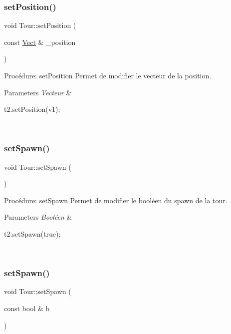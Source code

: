 \subsubsection{\texorpdfstring{set\+Position()}{setPosition()}}
{\footnotesize\ttfamily void Tour\+::set\+Position (\begin{DoxyParamCaption}\item[{const \hyperlink{classVect}{Vect} \&}]{\+\_\+position }\end{DoxyParamCaption})}



Procédure\+: set\+Position Permet de modifier le vecteur de la position. 


\begin{DoxyParams}{Parameters}
{\em Vecteur} & 
\begin{DoxyCode}
t2.setPosition(v1);
\end{DoxyCode}
 \\
\hline
\end{DoxyParams}
\mbox{\label{classTour_ae14b537e1e6fcfef00eadfd0d6d29e46}} 
\subsubsection{\texorpdfstring{set\+Spawn()}{setSpawn()}\hspace{0.1cm}{\footnotesize\ttfamily [1/2]}}
{\footnotesize\ttfamily void Tour\+::set\+Spawn (\begin{DoxyParamCaption}{ }\end{DoxyParamCaption})}



Procédure\+: set\+Spawn Permet de modifier le booléen du spawn de la tour. 


\begin{DoxyParams}{Parameters}
{\em Booléen} & 
\begin{DoxyCode}
t2.setSpawn(\textcolor{keyword}{true});
\end{DoxyCode}
 \\
\hline
\end{DoxyParams}
\mbox{\label{classTour_a896b0ab5f8a022d7deb6d599de8d4642}} 
\subsubsection{\texorpdfstring{set\+Spawn()}{setSpawn()}\hspace{0.1cm}{\footnotesize\ttfamily [2/2]}}
{\footnotesize\ttfamily void Tour\+::set\+Spawn (\begin{DoxyParamCaption}\item[{const bool \&}]{b }\end{DoxyParamCaption})}



